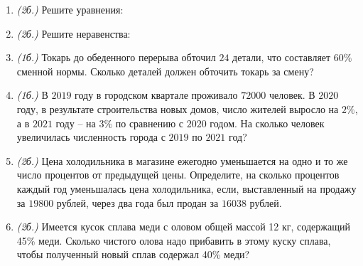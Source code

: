 \documentclass[12pt, a4paper]{article}
\begin{document}
	   \cfoot{}
	\begin{enumerate}[label=\textbf{\arabic*.}]
		\item \textit{(2б.)} Решите уравнения:
		\begin{enumerate}[label=\asbuk*)]
		\end{enumerate}
		\item \textit{(2б.)} Решите неравенства: 
		\begin{enumerate}[label=\asbuk*)]
		\end{enumerate}
		\item \textit{(1б.)} Токарь до обеденного перерыва обточил $24$ детали, что составляет $60\%$ сменной нормы. Сколько деталей должен обточить токарь за смену?
		\item \textit{(1б.)} В $2019$ году в городском квартале проживало $72000$ человек. В $2020$ году, в результате строительства новых домов, число жителей выросло на $2\%$, а в $2021$ году – на $3\%$ по сравнению с $2020$ годом. На сколько человек увеличилась численность города с $2019$ по $2021$ год?
		\item \textit{(2б.)} Цена холодильника в магазине ежегодно уменьшается на одно и то же число процентов от предыдущей цены. Определите, на сколько процентов каждый год уменьшалась цена холодильника, если, выставленный на продажу за $19 800$ рублей, через два года был продан за $16 038$ рублей.
		\item \textit{(2б.)} Имеется кусок сплава меди с оловом общей массой 12 кг, содержащий 45\% меди. Сколько чистого олова надо прибавить в этому куску сплава, чтобы полученный новый сплав содержал 40\% меди?
	\end{enumerate}
\end{document}
